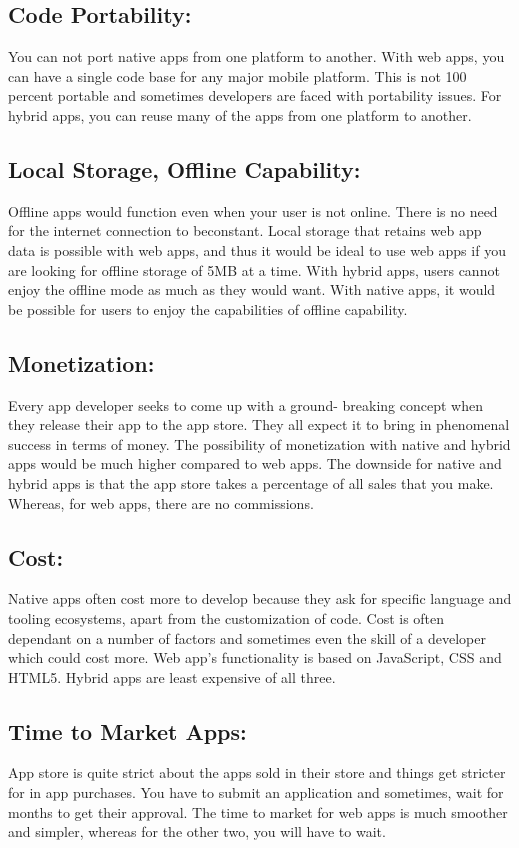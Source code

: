 \documentclass[14pt,a4paper,final]{extreport}
\begin{document}
\subsection{Code Portability:}
\item
You can not port native apps from one platform to another. With web apps, you can have a single code base for any major mobile platform. This is not 100 percent portable and sometimes developers are faced with portability issues. For hybrid apps, you can reuse many of the apps from one platform to another.
\subsection{Local Storage, Offline Capability:}
Offline apps would function even when your user is not online. There is no need for the internet connection to beconstant. Local storage that retains web app data is possible with web apps, and thus it would be ideal to use web apps if you are looking for offline storage of 5MB at a time. With hybrid apps, users cannot enjoy the offline mode as much as they would want. With native apps, it would be possible for users to enjoy the capabilities of offline capability.
\subsection{Monetization:}
Every app developer seeks to come up with a ground- breaking concept when they release their app to the app store. They all expect it to bring in phenomenal success in terms of money. The possibility of monetization with native and hybrid apps would be much higher compared to web apps. The downside for native and hybrid apps is that the app store takes a percentage of all sales that you make. Whereas, for web apps, there are no commissions.
\subsection{Cost:}
Native apps often cost more to develop because they ask for specific language and tooling ecosystems, apart from the customization of code. Cost is often dependant on a number of factors and sometimes even the skill of a developer which could cost more. Web app’s functionality is based on JavaScript, CSS and HTML5. Hybrid apps are least expensive of all three.
\subsection{Time to Market Apps:}
App store is quite strict about the apps sold in their store and things get stricter for in app purchases. You have to submit an application and sometimes, wait for months to get their approval. The time to market for web apps is much smoother and simpler, whereas for the other two, you will have to wait.
\end{document}
